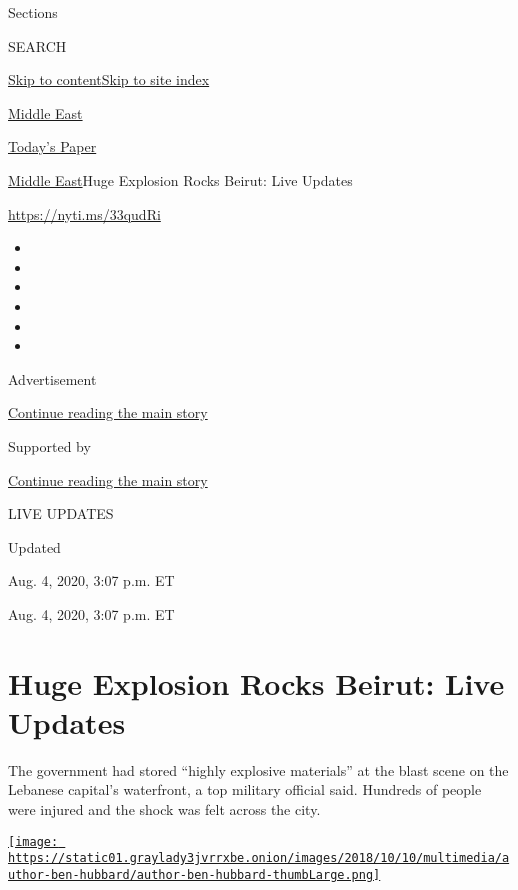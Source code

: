 Sections

SEARCH

\protect\hyperlink{site-content}{Skip to
content}\protect\hyperlink{site-index}{Skip to site index}

\href{https://www.nytimes3xbfgragh.onion/section/world/middleeast}{Middle
East}

\href{https://myaccount.nytimes3xbfgragh.onion/auth/login?response_type=cookie\&client_id=vi}{}

\href{https://www.nytimes3xbfgragh.onion/section/todayspaper}{Today's
Paper}

\href{/section/world/middleeast}{Middle East}\textbar{}Huge Explosion
Rocks Beirut: Live Updates

\url{https://nyti.ms/33qudRi}

\begin{itemize}
\item
\item
\item
\item
\item
\item
\end{itemize}

Advertisement

\protect\hyperlink{after-top}{Continue reading the main story}

Supported by

\protect\hyperlink{after-sponsor}{Continue reading the main story}

LIVE UPDATES

Updated~

Aug. 4, 2020, 3:07 p.m. ET

Aug. 4, 2020, 3:07 p.m. ET

\hypertarget{huge-explosion-rocks-beirut-live-updates}{%
\section{Huge Explosion Rocks Beirut: Live
Updates}\label{huge-explosion-rocks-beirut-live-updates}}

The government had stored ``highly explosive materials'' at the blast
scene on the Lebanese capital's waterfront, a top military official
said. Hundreds of people were injured and the shock was felt across the
city.

\href{https://www.nytimes3xbfgragh.onion/by/ben-hubbard}{\texttt{[image: https://static01.graylady3jvrrxbe.onion/images/2018/10/10/multimedia/author-ben-hubbard/author-ben-hubbard-thumbLarge.png]}}

